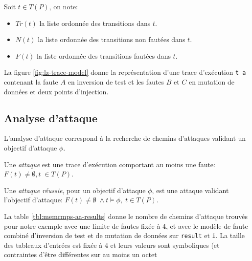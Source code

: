             \begin{defi}
                Soit $t \in T(P)$, on note: 
                \begin{itemize}
                    \item $Tr(t)$ la liste ordonnée des transitions dans $t$.
                    \item $N(t)$ la liste ordonnée des transitions non fautées dans $t$.
                    \item $F(t)$ la liste ordonnée des transitions fautées dans $t$.
                \end{itemize}
            \end{defi}
        
            La figure \ref{fig:lz-trace-model} donne la représentation d'une trace d'exécution \texttt{t\_a} contenant la faute $A$ en inversion de test et les fautes $B$ et $C$ en mutation de données et deux points d'injection.
            
        \subsection{Analyse d'attaque}
        \label{sec:lazart-aa}
            
            L'analyse d'attaque correspond à la recherche de chemins d'attaques validant un objectif d'attaque $\phi$.
            
            \begin{defi}
                Une \textit{attaque} est une trace d'exécution comportant au moins une faute: $F(t) \neq \emptyset, t \; \in T(P)$.
            \end{defi}
            
            \begin{defi}
                Une \textit{attaque réussie}, pour un objectif d'attaque $\phi$, est une attaque validant l'objectif d'attaque: $F(t) \neq \emptyset \; \land t \vDash \phi, \; t \in T(P)$.
                
            \end{defi}
            
            La table \ref{tbl:memcmps-aa-results} donne le nombre de chemins d'attaque trouvés pour notre exemple avec une limite de fautes fixée à 4, et avec le modèle de faute combiné d'inversion de test et de mutation de données sur \texttt{result} et \texttt{i}. La taille des tableaux d'entrées est fixée à 4 et leurs valeurs sont symboliques (et contraintes d'être différentes sur au moins un octet
        
